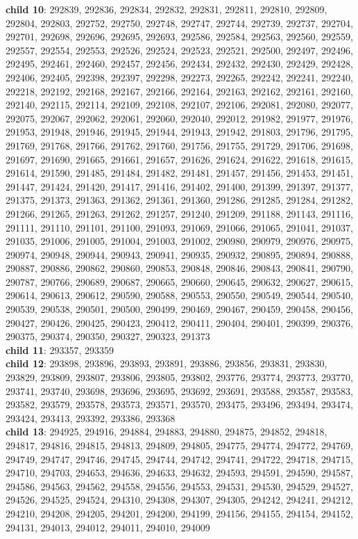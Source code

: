 \begin{itemize}
	\textbf{child 10}: 292839, 292836, 292834, 292832, 292831, 292811, 292810, 292809, 292804, 292803, 292752, 292750, 292748, 292747, 292744, 292739, 292737, 292704, 292701, 292698, 292696, 292695, 292693, 292586, 292584, 292563, 292560, 292559, 292557, 292554, 292553, 292526, 292524, 292523, 292521, 292500, 292497, 292496, 292495, 292461, 292460, 292457, 292456, 292434, 292432, 292430, 292429, 292428, 292406, 292405, 292398, 292397, 292298, 292273, 292265, 292242, 292241, 292240, 292218, 292192, 292168, 292167, 292166, 292164, 292163, 292162, 292161, 292160, 292140, 292115, 292114, 292109, 292108, 292107, 292106, 292081, 292080, 292077, 292075, 292067, 292062, 292061, 292060, 292040, 292012, 291982, 291977, 291976, 291953, 291948, 291946, 291945, 291944, 291943, 291942, 291803, 291796, 291795, 291769, 291768, 291766, 291762, 291760, 291756, 291755, 291729, 291706, 291698, 291697, 291690, 291665, 291661, 291657, 291626, 291624, 291622, 291618, 291615, 291614, 291590, 291485, 291484, 291482, 291481, 291457, 291456, 291453, 291451, 291447, 291424, 291420, 291417, 291416, 291402, 291400, 291399, 291397, 291377, 291375, 291373, 291363, 291362, 291361, 291360, 291286, 291285, 291284, 291282, 291266, 291265, 291263, 291262, 291257, 291240, 291209, 291188, 291143, 291116, 291111, 291110, 291101, 291100, 291093, 291069, 291066, 291065, 291041, 291037, 291035, 291006, 291005, 291004, 291003, 291002, 290980, 290979, 290976, 290975, 290974, 290948, 290944, 290943, 290941, 290935, 290932, 290895, 290894, 290888, 290887, 290886, 290862, 290860, 290853, 290848, 290846, 290843, 290841, 290790, 290787, 290766, 290689, 290687, 290665, 290660, 290645, 290632, 290627, 290615, 290614, 290613, 290612, 290590, 290588, 290553, 290550, 290549, 290544, 290540, 290539, 290538, 290501, 290500, 290499, 290469, 290467, 290459, 290458, 290456, 290427, 290426, 290425, 290423, 290412, 290411, 290404, 290401, 290399, 290376, 290375, 290374, 290350, 290327, 290323, 291373 \\
	\textbf{child 11}: 293357, 293359 \\
	\textbf{child 12}: 293898, 293896, 293893, 293891, 293886, 293856, 293831, 293830, 293829, 293809, 293807, 293806, 293805, 293802, 293776, 293774, 293773, 293770, 293741, 293740, 293698, 293696, 293695, 293692, 293691, 293588, 293587, 293583, 293582, 293579, 293578, 293573, 293571, 293570, 293475, 293496, 293494, 293474, 293424, 293413, 293392, 293386, 293368 \\
	\textbf{child 13}: 294925, 294916, 294884, 294883, 294880, 294875, 294852, 294818, 294817, 294816, 294815, 294813, 294809, 294805, 294775, 294774, 294772, 294769, 294749, 294747, 294746, 294745, 294744, 294742, 294741, 294722, 294718, 294715, 294710, 294703, 294653, 294636, 294633, 294632, 294593, 294591, 294590, 294587, 294586, 294563, 294562, 294558, 294556, 294553, 294531, 294530, 294529, 294527, 294526, 294525, 294524, 294310, 294308, 294307, 294305, 294242, 294241, 294212, 294210, 294208, 294205, 294201, 294200, 294199, 294156, 294155, 294154, 294152, 294131, 294013, 294012, 294011, 294010, 294009 \\

\end{itemize}
